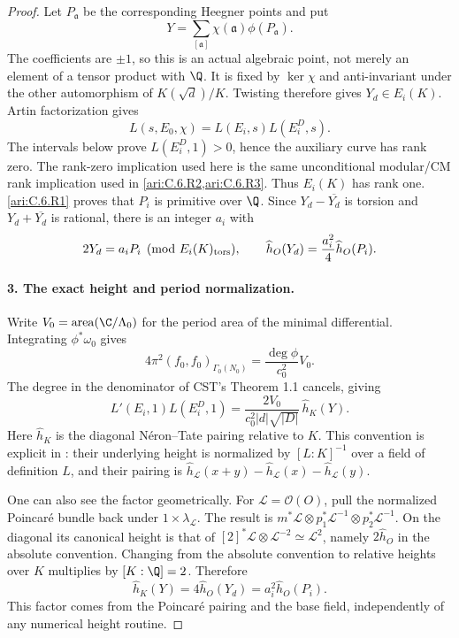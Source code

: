 \begin{proof}
Let $P_{\mathfrak a}$ be the corresponding Heegner points and put
\[
 Y=\sum_{[\mathfrak a]}\chi(\mathfrak a)\phi(P_{\mathfrak a}).
\]
The coefficients are $\pm1$, so this is an actual algebraic point,
not merely an element of a tensor product with $\Q$. It is fixed
by $\ker\chi$ and anti-invariant under the other automorphism of
$K(\sqrt d)/K$. Twisting therefore gives $Y_d\in E_i(K)$.
Artin factorization gives
\[
 L(s,E_0,\chi)=L(E_i,s)L(E_i^D,s).
\]
The intervals below prove $L(E_i^D,1)>0$, hence the auxiliary
curve has rank zero. The rank-zero implication used here is the
same unconditional modular/CM rank implication used in \cref{ari:C.6.R2,ari:C.6.R3}.
Thus $E_i(K)$ has rank one. \ref{ari:C.6.R1} proves that $P_i$ is primitive
over $\Q$. Since $Y_d-\overline{Y_d}$ is torsion and
$Y_d+\overline{Y_d}$ is rational, there is an integer $a_i$ with
\[
 2Y_d=a_iP_i\pmod{E_i(K)_{\rm tors}},\qquad
 \widehat h_O(Y_d)=\frac{a_i^2}{4}\widehat h_O(P_i).
\]

\paragraph{3. The exact height and period normalization.}
Write $V_0=\operatorname{area}(\C/\Lambda_0)$ for the period area
of the minimal differential. Integrating $\phi^*\omega_0$ gives
\[
 4\pi^2(f_0,f_0)_{\Gamma_0(N_0)}
   =\frac{\deg\phi}{c_0^2}V_0.
\]
The degree in the denominator of CST's Theorem 1.1 cancels, giving
\begin{equation}\label{ari:eq:Cgz-product}
 L'(E_i,1)L(E_i^D,1)
  =\frac{2V_0}{c_0^2|d|\sqrt{|D|}}\,\widehat h_K(Y).
\end{equation}
Here $\widehat h_K$ is the diagonal N\'eron--Tate pairing relative
to $K$. This convention is explicit in
\citet[\S7.1.1, pp.~218--219, Theorem 7.1.2]{CgzYZZ2011}:
their underlying height is normalized by $[L:K]^{-1}$ over a
field of definition $L$, and their pairing is
$\widehat h_{\mathcal L}(x+y)-\widehat h_{\mathcal L}(x)
-\widehat h_{\mathcal L}(y)$.

One can also see the factor geometrically. For
$\mathcal L=\mathcal O(O)$, pull the normalized Poincar\'e bundle
back under $1\times\lambda_{\mathcal L}$. The result is
$m^*\mathcal L\otimes p_1^*\mathcal L^{-1}\otimes
p_2^*\mathcal L^{-1}$. On the diagonal its canonical height is
that of $[2]^*\mathcal L\otimes\mathcal L^{-2}\simeq
\mathcal L^2$, namely $2\widehat h_O$ in the absolute convention.
Changing from the absolute convention to relative heights over
$K$ multiplies by $[K:\Q]=2$. Therefore
\[
 \widehat h_K(Y)=4\widehat h_O(Y_d)
                =a_i^2\widehat h_O(P_i).
\]
This factor comes from the Poincar\'e pairing and the base field,
independently of any numerical height routine.


\end{proof}

